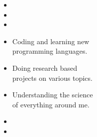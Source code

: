 \documentclass[10pt,a4paper,ragged2e,withhyper]{altacv}
\begin{document}
    \begin{paracol}{2}
            \begin{itemize}
            	\item {}
            	
            	\item {}
            	
            	\item {}
            \end{itemize}
        
            

            \begin{itemize}
                \item Coding and learning new \\programming languages.
                \smallskip
                \item Doing research based \\projects on various topics.
                \smallskip
                \item Understanding the science \\of everything around me.
            \end{itemize}
        
            \begin{itemize}
                \item {}
                \smallskip
                \item {}
            \end{itemize}
            

\end{paracol}
\end{document}
